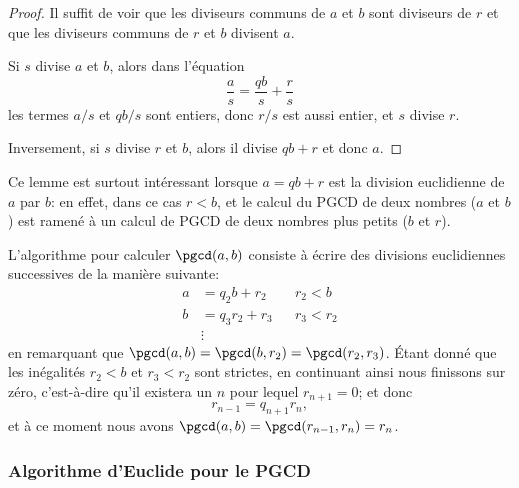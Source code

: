 \begin{proof}
	Il suffit de voir que les diviseurs communs de \( a\) et \( b\) sont diviseurs de \( r\) et que les diviseurs communs de \( r\) et \( b\) divisent \( a\).

	Si \( s\) divise \( a\) et \( b\), alors dans l'équation
	\begin{equation*}
		\frac{ a }{ s }=\frac{ qb }{ s }+\frac{ r }{ s }
	\end{equation*}
	les termes \( a/s\) et \( qb/s\) sont entiers, donc \( r/s\) est aussi entier, et \( s\) divise \( r\).

	Inversement, si \( s\) divise \( r\) et \( b\), alors il divise \( qb+r\) et donc \( a\).
\end{proof}
\begin{remark}
	Ce lemme est surtout intéressant lorsque \( a=qb+r\) est la division euclidienne de \( a\) par \( b\): en effet, dans ce cas \( r < b \), et le calcul du PGCD de deux nombres (\(a \) et \( b\)) est ramené à un calcul de PGCD de deux nombres plus petits (\( b\) et \( r\)).

	L'algorithme pour calculer \( \pgcd(a,b)\) consiste à écrire des divisions euclidiennes successives de la manière suivante:
	\begin{subequations}
		\begin{align}
			a & = q_2 b   + r_2 &  & r_2<b   \\
			b & = q_3 r_2 + r_3 &  & r_3<r_2 \\
			  & \vdots
		\end{align}
	\end{subequations}
	en remarquant que \( \pgcd(a,b)=\pgcd(b,r_2)=\pgcd(r_2,r_3) \). Étant donné que les inégalités \( r_2<b\) et \( r_3<r_2\) sont strictes, en continuant ainsi nous finissons sur zéro, c'est-à-dire qu'il existera un \( n\) pour lequel \( r_{n+1} = 0 \); et donc
	\begin{equation*}
		r_{n-1}=q_{n+1}r_n,
	\end{equation*}
	et à ce moment nous avons \( \pgcd(a,b)=\pgcd(r_{n-1},r_n)=r_n\).
\end{remark}

\subsubsection{Algorithme d'Euclide pour le PGCD}
\label{SUBSECooAEBLooFGJRkg}


